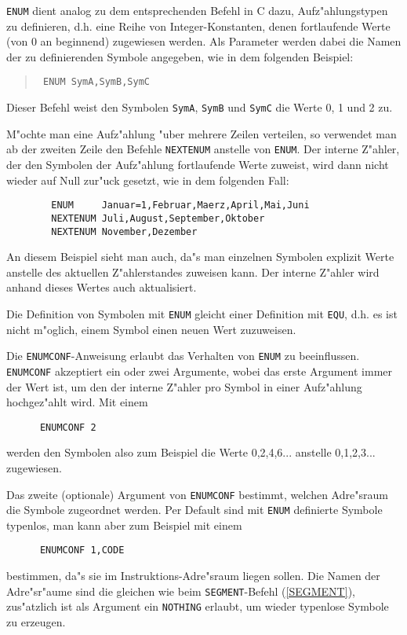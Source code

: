 \documentclass[12pt,a4paper,twoside]{report}
\newcommand{\tty}[1]{{\tt #1}}
\begin{document}
\tty{ENUM} dient analog zu dem entsprechenden Befehl in C dazu,
Aufz"ahlungstypen zu definieren, d.h. eine Reihe von Integer-Konstanten,
denen fortlaufende Werte (von 0 an beginnend) zugewiesen
werden. Als Parameter werden dabei die Namen der zu definierenden
Symbole angegeben, wie in dem folgenden Beispiel:
\begin{quote}{\tt
        ENUM    SymA,SymB,SymC}
\end{quote}
Dieser Befehl weist den Symbolen \tty{SymA}, \tty{SymB} und \tty{SymC}
die Werte 0, 1 und 2 zu.
\par
M"ochte man eine Aufz"ahlung "uber mehrere Zeilen verteilen, so
verwendet man ab der zweiten Zeile den Befehle \tty{NEXTENUM}
anstelle von \tty{ENUM}.  Der interne Z"ahler, der den Symbolen
der Aufz"ahlung fortlaufende Werte zuweist, wird dann nicht
wieder auf Null zur"uck gesetzt, wie in dem folgenden Fall:
\begin{verbatim}
        ENUM     Januar=1,Februar,Maerz,April,Mai,Juni
        NEXTENUM Juli,August,September,Oktober
        NEXTENUM November,Dezember
\end{verbatim}
An diesem Beispiel sieht man auch, da"s man einzelnen Symbolen
explizit Werte anstelle des aktuellen Z"ahlerstandes zuweisen
kann.  Der interne Z"ahler wird anhand dieses Wertes auch
aktualisiert.

Die Definition von Symbolen mit \tty{ENUM} gleicht einer Definition
mit \tty{EQU}, d.h. es ist nicht m"oglich, einem Symbol einen neuen
Wert zuzuweisen.

Die \tty{ENUMCONF}-Anweisung erlaubt das Verhalten von \tty{ENUM}
zu beeinflussen.  \tty{ENUMCONF} akzeptiert ein oder zwei
Argumente, wobei das erste Argument immer der Wert ist, um den
der interne Z"ahler pro Symbol in einer Aufz"ahlung hochgez"ahlt
wird.  Mit einem
\begin{verbatim}
      ENUMCONF 2
\end{verbatim}
werden den Symbolen also zum Beispiel die Werte 0,2,4,6...
anstelle 0,1,2,3... zugewiesen.

Das zweite (optionale) Argument von \tty{ENUMCONF} bestimmt,
welchen Adre"sraum die Symbole zugeordnet werden.  Per Default
sind mit \tty{ENUM} definierte Symbole typenlos, man kann aber
zum Beispiel mit einem
\begin{verbatim}
      ENUMCONF 1,CODE
\end{verbatim}  
bestimmen, da"s sie im Instruktions-Adre"sraum liegen sollen.  Die
Namen der Adre"sr"aume sind die gleichen wie beim
\tty{SEGMENT}-Befehl (\ref{SEGMENT}), zus"atzlich ist als
Argument ein \tty{NOTHING} erlaubt, um wieder typenlose Symbole
zu erzeugen.
\end{document}
